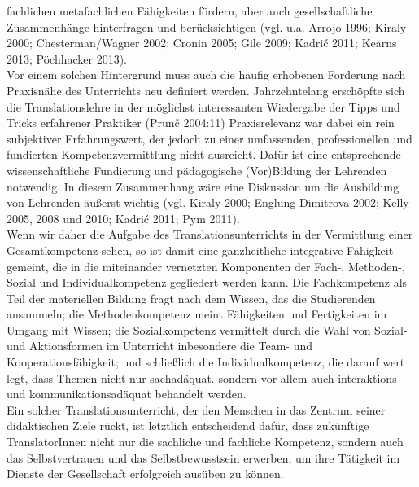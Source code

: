 \documentclass{article}
\begin{document}
	fachlichen metafachlichen Fähigkeiten fördern, aber auch gesellschaftliche Zusammenhänge hinterfragen und berücksichtigen (vgl. u.a. Arrojo 1996; Kiraly 2000; Chesterman/Wagner 2002; Cronin 2005; Gile 2009; Kadrić 2011; Kearns 2013; Pöchhacker 2013). \\
	Vor einem solchen Hintergrund muss auch die häufig erhobenen Forderung nach \glqq Praxisnähe\grqq \: des Unterrichts neu definiert werden. Jahrzehntelang erschöpfte sich die Translationslehre \glqq in der möglichst interessanten Wiedergabe der Tipps und Tricks erfahrener Praktiker\grqq \: (Prun\v c 2004:11) Praxisrelevanz war dabei ein rein subjektiver Erfahrungswert, der jedoch zu einer umfassenden, professionellen und fundierten Kompetenzvermittlung nicht ausreicht. Dafür ist eine entsprechende wissenschaftliche Fundierung und pädagogische (Vor)Bildung der Lehrenden notwendig. In diesem Zusammenhang wäre eine Diskussion um die Ausbildung von Lehrenden äußerst wichtig (vgl. Kiraly 2000; Englung Dimitrova 2002; Kelly 2005, 2008 und 2010; Kadrić 2011; Pym 2011). \\
	Wenn wir daher die Aufgabe des Translationsunterrichts in der Vermittlung einer Gesamtkompetenz sehen, so ist damit eine ganzheitliche integrative Fähigkeit gemeint, die in die miteinander vernetzten Komponenten der Fach-, Methoden-, Sozial und Individualkompetenz gegliedert werden kann. Die Fachkompetenz als Teil der materiellen Bildung fragt nach dem Wissen, das die Studierenden ansammeln; die Methodenkompetenz meint Fähigkeiten und Fertigkeiten im Umgang mit Wissen; die Sozialkompetenz vermittelt durch die Wahl von Sozial- und Aktionsformen im Unterricht inbesondere die Team- und Kooperationsfähigkeit; und schließlich die Individualkompetenz, die darauf wert legt, dass Themen nicht nur sachadäquat. sondern vor allem auch interaktions- und kommunikationsadäquat behandelt werden. \\
	Ein solcher Translationsunterricht, der den Menschen in das Zentrum seiner didaktischen Ziele rückt, ist letztlich entscheidend dafür, dass zukünftige TranslatorInnen nicht nur die sachliche und fachliche Kompetenz, sondern auch das Selbstvertrauen und das Selbstbewusstsein erwerben, um ihre Tätigkeit im Dienste der Gesellschaft erfolgreich ausüben zu können.
	
\end{document}
